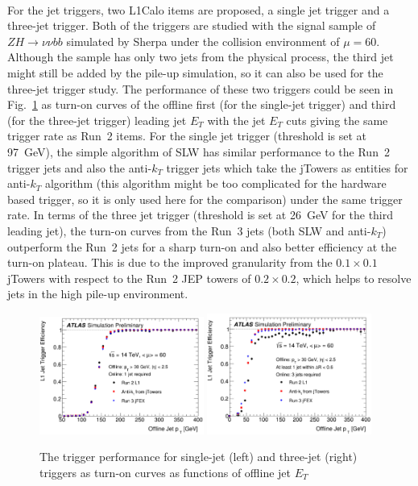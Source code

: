 \\For the jet triggers, two L1Calo items are proposed, a single jet trigger and a three-jet trigger. Both of the triggers are studied with the signal sample of $ZH\to\nu\nu bb$ simulated by Sherpa under the collision environment of $\mu=60$. Although the sample has only two jets from the physical process, the third jet might still be added by the pile-up simulation, so it can also be used for the three-jet trigger study. The performance of these two triggers could be seen in Fig.~\ref{Fig:jet_perf} as turn-on curves of the offline first (for the single-jet trigger) and third (for the three-jet trigger) leading jet $E_{T}$ with the jet $E_{T}$ cuts giving the same trigger rate as Run~2 items. For the single jet trigger (threshold is set at 97~GeV), the simple algorithm of SLW has similar performance to the Run~2 trigger jets and also the anti-$k_{T}$ trigger jets which take the jTowers as entities for anti-$k_T$ algorithm (this algorithm might be too complicated for the hardware based trigger, so it is only used here for the comparison) under the same trigger rate. In terms of the three jet trigger (threshold is set at 26~GeV for the third leading jet), the turn-on curves from the Run~3 jets (both SLW and anti-$k_{T}$) outperform the Run~2 jets for a sharp turn-on and also better efficiency at the turn-on plateau. This is due to the improved granularity from the $0.1\times0.1$ jTowers with respect to the Run~2 JEP towers of $0.2\times0.2$, which helps to resolve jets in the high pile-up environment. 
\begin{figure}[!h]                
	\includegraphics[width=0.48\textwidth]{Chapter6/perf_1jet.png}
	\includegraphics[width=0.48\textwidth]{Chapter6/perf_3jets.png}
	\begin{center}
		\caption{The trigger performance for single-jet (left) and three-jet (right) triggers as turn-on curves as functions of offline jet $E_{T}$}
		\label{Fig:jet_perf}            
	\end{center}
\end{figure}

